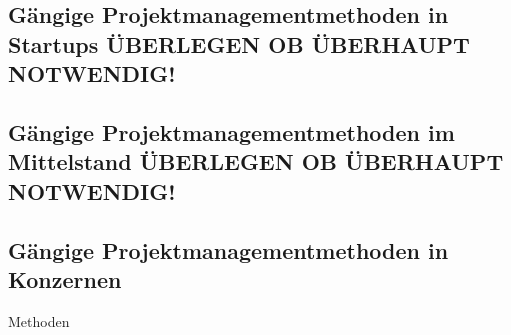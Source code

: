 

\subsection{G\"angige Projektmanagementmethoden in Startups ÜBERLEGEN OB ÜBERHAUPT NOTWENDIG!} 

\subsection{G\"angige Projektmanagementmethoden im Mittelstand ÜBERLEGEN OB ÜBERHAUPT NOTWENDIG!} \label{Kap:MethodenMittelstand}

\subsection{G\"angige Projektmanagementmethoden in Konzernen} \label{Kap:MethodenKonzerne}
Methoden
